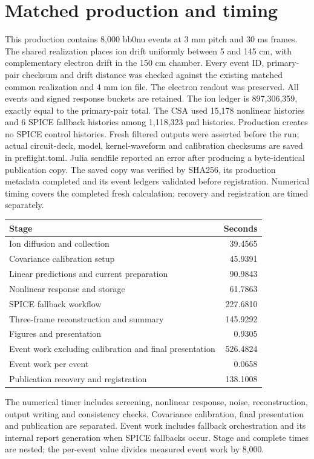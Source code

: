 \section{Matched production and timing}
This production contains 8,000 bb0nu events at 3 mm pitch and 30 ms frames. The shared realization places ion drift uniformly between 5 and 145 cm, with complementary electron drift in the 150 cm chamber. Every event ID, primary-pair checksum and drift distance was checked against the existing matched common realization and 4 mm ion file. The electron readout was preserved. All events and signed response buckets are retained. The ion ledger is 897,306,359, exactly equal to the primary-pair total. The CSA used 15,178 nonlinear histories and 6 SPICE fallback histories among 1,118,323 pad histories. Production creates no SPICE control histories. Fresh filtered outputs were asserted before the run; actual circuit-deck, model, kernel-waveform and calibration checksums are saved in preflight.toml. Julia sendfile reported an error after producing a byte-identical publication copy. The saved copy was verified by SHA256, its production metadata completed and its event ledgers validated before registration. Numerical timing covers the completed fresh calculation; recovery and registration are timed separately.
\begin{center}\small\begin{tabular}{p{11cm}r}\toprule Stage & Seconds\\\midrule
Ion diffusion and collection & 39.4565 \\
Covariance calibration setup & 45.9391 \\
Linear predictions and current preparation & 90.9843 \\
Nonlinear response and storage & 61.7863 \\
SPICE fallback workflow & 227.6810 \\
Three-frame reconstruction and summary & 145.9292 \\
Figures and presentation & 0.9305 \\
Event work excluding calibration and final presentation & 526.4824 \\
Event work per event & 0.0658 \\
Publication recovery and registration & 138.1008 \\
\bottomrule\end{tabular}\end{center}
The numerical timer includes screening, nonlinear response, noise, reconstruction, output writing and consistency checks. Covariance calibration, final presentation and publication are separated. Event work includes fallback orchestration and its internal report generation when SPICE fallbacks occur. Stage and complete times are nested; the per-event value divides measured event work by 8,000.
